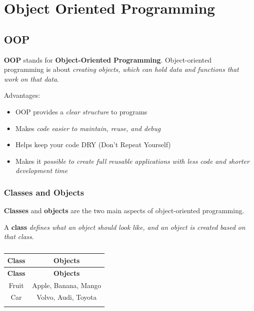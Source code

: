 \documentclass[../basic_programs.tex]{subfiles}
\begin{document}
    \chapter{Object Oriented Programming}

    \section{OOP}

    \begin{mydef}
        \textbf{OOP} stands for \textbf{Object-Oriented Programming}. Object-oriented programming is about \textit{creating objects, which can hold data and functions that work on that data}.
    \end{mydef}

    Advantages:
    \begin{itemize}
        \item OOP provides a \textit{clear structure} to programs
        \item Makes \textit{code easier to maintain, reuse, and debug}
        \item Helps keep your code DRY (Don't Repeat Yourself)
        \item Makes it \textit{possible to create full reusable applications with less code and shorter development time}
    \end{itemize}

    \subsection{Classes and Objects}

    \textbf{Classes} and \textbf{objects} are the two main aspects of object-oriented programming.

    \begin{mydef}
        A \textbf{class} \textit{defines what an object should look like, and an object is created based on that class}.
    \end{mydef}

    \begin{longtable}{c c}
        \toprule
        \textbf{Class} & \textbf{Objects} \\
        \midrule
        \endfirsthead

        \toprule
        \textbf{Class} & \textbf{Objects} \\
        \midrule
        \endhead

        Fruit & Apple, Banana, Mango \\
        \hline
        Car   & Volvo, Audi, Toyota \\

        \bottomrule
        \caption{}
        \label{}
        \endlastfoot
    \end{longtable}
\end{document}
